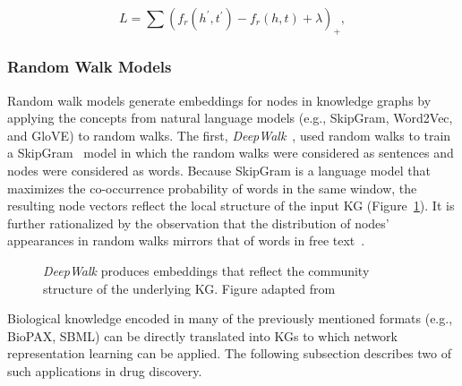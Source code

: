 \begin{equation}\label{eq:margin_ranked_loss}
    L = \sum_{}^{}(f_r(h^{'},t^{'}) - f_r(h,t) + \lambda )_+,
\end{equation}

\subsubsection{Random Walk Models}

Random walk models generate embeddings for nodes in knowledge graphs by applying the concepts from natural language models (e.g., SkipGram, Word2Vec, and GloVE) to random walks.
The first, \textit{DeepWalk}~\cite{Perozzi2014}, used random walks to train a SkipGram~\cite{Mikolov2013} model in which the random walks were considered as sentences and nodes were considered as words.
Because SkipGram is a language model that maximizes the co-occurrence probability of words in the same window, the resulting node vectors reflect the local structure of the input \ac{KG} (Figure~\ref{fig:deepwalk_embedding}).
It is further rationalized by the observation that the distribution of nodes' appearances in random walks mirrors that of words in free text~\cite{Perozzi2014}.

\begin{figure}
    \captionsetup{format=plain}
    \caption{\textit{DeepWalk} produces embeddings that reflect the community structure of the underlying \ac{KG}. Figure adapted from ~\cite{Perozzi2014}}
    \label{fig:deepwalk_embedding}
\end{figure}

Biological knowledge encoded in many of the previously mentioned formats (e.g., \ac{BioPAX}, \ac{SBML}) can be directly translated into \ac{KG}s to which network representation learning can be applied.
The following subsection describes two of such applications in drug discovery.
